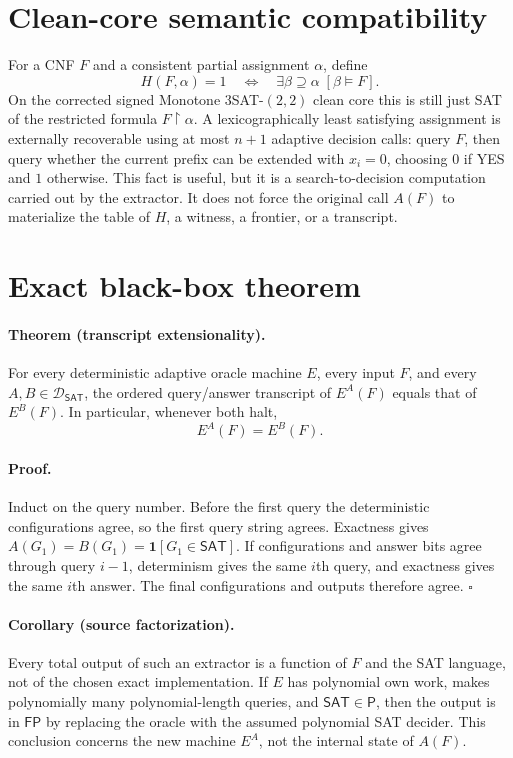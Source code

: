 \documentclass[11pt]{article}
\newcommand{\SAT}{\mathsf{SAT}}
\begin{document}
\section{Clean-core semantic compatibility}
For a CNF $F$ and a consistent partial assignment $\alpha$, define
\[
 H(F,\alpha)=1
 \quad\Longleftrightarrow\quad
 \exists\beta\supseteq\alpha\;[\beta\models F].
\]
On the corrected signed Monotone $3$SAT-$(2,2)$ clean core this is still just
SAT of the restricted formula $F\upharpoonright\alpha$.  A lexicographically
least satisfying assignment is externally recoverable using at most $n+1$
adaptive decision calls: query $F$, then query whether the current prefix can
be extended with $x_i=0$, choosing $0$ if YES and $1$ otherwise.  This fact is
useful, but it is a search-to-decision computation carried out by the
extractor.  It does not force the original call $A(F)$ to materialize the
table of $H$, a witness, a frontier, or a transcript.

\section{Exact black-box theorem}
\paragraph{Theorem (transcript extensionality).}
For every deterministic adaptive oracle machine $E$, every input $F$, and
every $A,B\in\mathcal D_{\SAT}$, the ordered query/answer transcript of
$E^A(F)$ equals that of $E^B(F)$.  In particular, whenever both halt,
\[
 E^A(F)=E^B(F).
\]

\paragraph{Proof.}
Induct on the query number.  Before the first query the deterministic
configurations agree, so the first query string agrees.  Exactness gives
$A(G_1)=B(G_1)=\mathbf 1[G_1\in\SAT]$.  If configurations and answer bits
agree through query $i-1$, determinism gives the same $i$th query, and
exactness gives the same $i$th answer.  The final configurations and outputs
therefore agree. \hfill$\square$

\paragraph{Corollary (source factorization).}
Every total output of such an extractor is a function of $F$ and the SAT
language, not of the chosen exact implementation.  If $E$ has polynomial own
work, makes polynomially many polynomial-length queries, and $\SAT\in\mathsf
P$, then the output is in $\mathsf{FP}$ by replacing the oracle with the
assumed polynomial SAT decider.  This conclusion concerns the new machine
$E^A$, not the internal state of $A(F)$.
\end{document}
